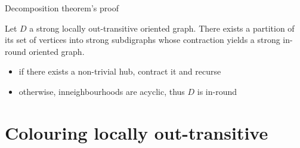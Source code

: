 \documentclass{beamer}
\begin{document}
\begin{frame}{Decomposition theorem's proof}

\begin{theorem}
Let $D$ a strong locally out-transitive oriented graph. There exists a partition of its set of vertices into strong subdigraphs whose contraction yields a strong in-round oriented graph.
\end{theorem}

\begin{itemize}
    \item if there exists a non-trivial hub, contract it and recurse
    \item otherwise, inneighbourhoods are acyclic, thus $D$ is in-round
\end{itemize}


\end{frame}

\section{Colouring locally out-transitive}
\end{document}
